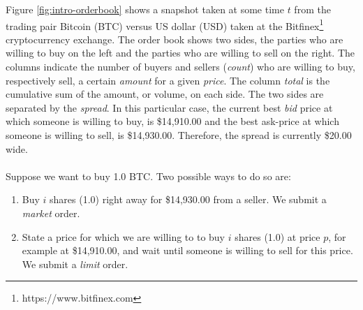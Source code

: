 Figure \ref{fig:intro-orderbook} shows a snapshot taken at some time $t$ from the trading pair Bitcoin (BTC) versus US dollar (USD) taken at the Bitfinex\footnote{https://www.bitfinex.com} cryptocurrency exchange.
The order book shows two sides, the parties who are willing to buy on the left and the parties who are willing to sell on the right.
The columns indicate the number of buyers and sellers (\textit{count}) who are willing to buy, respectively sell, a certain \textit{amount} for a given \textit{price}.
The column \textit{total} is the cumulative sum of the amount, or volume, on each side.
The two sides are separated by the \textit{spread}.
In this particular case, the current best \textit{bid} price at which someone is willing to buy, is \$14,910.00 and the best ask-price at which someone is willing to sell, is \$14,930.00.
Therefore, the spread is currently \$20.00 wide.
\\
\\
Suppose we want to buy 1.0 BTC.
Two possible ways to do so are:
\begin{enumerate}
    \item Buy $i$ shares (1.0) right away for \$14,930.00 from a seller. We submit a \textit{market} order.
    \item State a price for which we are willing to to buy $i$ shares (1.0) at price $p$, for example at \$14,910.00, and wait until someone is willing to sell for this price. We submit a \textit{limit} order.
\end{enumerate}

